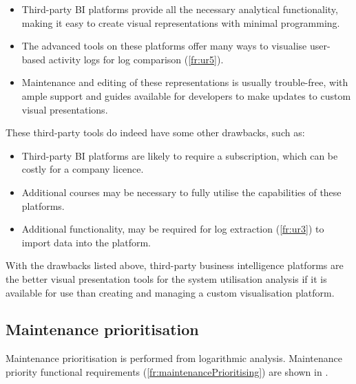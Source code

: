 \begin{itemize}
	\item \RaggedRight Third-party BI platforms provide all the necessary analytical functionality, making it easy to create visual representations with minimal programming.
	\item \RaggedRight The advanced tools on these platforms offer many ways to visualise user-based activity logs for log comparison (\ref{fr:ur5}).
	\item \RaggedRight Maintenance and editing of these representations is usually trouble-free, with ample support and guides available for developers to make updates to custom visual presentations.
	\end{itemize}

These third-party tools do indeed have some other drawbacks, such as:

\begin{itemize}
	\item \RaggedRight Third-party BI platforms are likely to require a subscription, which can be costly for a company licence.
	\item \RaggedRight Additional courses may be necessary to fully utilise the capabilities of these platforms.
	\item \RaggedRight Additional functionality, may be required for log extraction (\ref{fr:ur3}) to import data into the platform.
	\end{itemize}

With the drawbacks listed above, third-party business intelligence platforms are the better visual presentation tools for the system utilisation analysis if it is available for use than creating and managing a custom visualisation platform.

\subsection{Maintenance prioritisation}\label{sec:ch2_utilisationImprovements}
Maintenance prioritisation is performed from logarithmic analysis. Maintenance priority functional requirements (\ref{fr:maintenancePrioritising}) are shown in .


